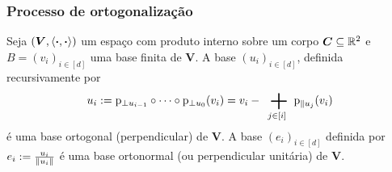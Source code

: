 \begin{comment}
Podemos também decompor um vetor $v$ com relação a um conjunto finito $U$ como
	\begin{equation*}
	v = \proj_{\parallel U}(v) + \proj_{\perp U}(v).
	\end{equation*}
em que
	\begin{align*}
	\func{\proj_{\parallel U}}{V}{V}{v}{\sum_{u \in U}\proj_{\parallel u}(v)}
	\end{align*}
	\begin{align*}
	\func{\proj_{\perp U}}{V}{V}{v}{v-\proj_{\parallel U}(v)}.
	\end{align*}

Isso é o mesmo que dizer que
	\begin{equation*}
	\proj_{\parallel U} = \sum_{u \in U} \proj_{\parallel u}
	\end{equation*}
e
	\begin{equation*}
	\proj_{\perp U} = \Id - \proj_{\parallel U}.
	\end{equation*}

Notemos que, para todo $v \in V$ e todo $u \in U$,
	\begin{equation*}
	\proj_{\perp U}(v) \perp u
	\end{equation*}
pois
	\begin{align*}
	\inte{\proj_{\perp U} (v)}{u} &= \inte{v-\proj_{\parallel U}(v)}{u} \\
		&= \inte{v - \sum_{u \in U}\proj_{\parallel u}(v)}{u} \\
		&= \inte{v}{u} - \sum_{u \in U} \inte{\proj_{\parallel u}(v)}{u} \\
	\end{align*}

\end{comment}


\subsubsection{Processo de ortogonalização}

Seja $(\bm V,\left\langle{\bm{\cdot}},{\bm{\cdot}}\right\rangle)$ um espaço com produto interno sobre um corpo $\bm C \subseteq \mathbb{R}^2$ e $B = (v_i)_{i \in [d]}$ uma base finita de $\bm V$. A base $(u_i)_{i \in [d]}$, definida recursivamente por
	\begin{equation*}
	u_i := \proj_{\perp u_{i-1}} \circ \cdots \circ \proj_{\perp u_0} (v_i) =  v_i - \sum_{j \in [i]} \proj_{\parallel u_j} (v_i)
	\end{equation*}
é uma base ortogonal (perpendicular) de $\bm V$. A base $(e_i)_{i \in [d]}$ definida por $e_i := \frac{u_i}{\left\Vert{u_i}\right\Vert}$ é uma base ortonormal (ou perpendicular unitária) de $\bm V$.


